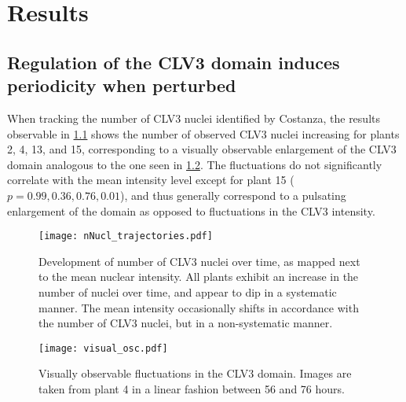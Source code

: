 
\chapter{Results}

\ifpdf
    \graphicspath{{Chapter3/Figs/Raster/}{Chapter3/Figs/PDF/}{Chapter3/Figs/}}
\else
    \graphicspath{{Chapter3/Figs/Vector/}{Chapter3/Figs/}}
\fi

\section{Regulation of the CLV3 domain induces periodicity when perturbed}
When tracking the number of CLV3 nuclei identified by Costanza, the results
observable in \cref{fig:clv3_trajs} shows the number of observed CLV3 nuclei
increasing for plants 2, 4, 13, and 15, corresponding to a visually observable
enlargement of the CLV3 domain analogous to the one seen in
\cref{fig:visual_osc}. The fluctuations do not significantly correlate with the
mean intensity level except for plant 15 ($p = 0.99, 0.36, 0.76, 0.01$), and
thus generally correspond to a pulsating enlargement of the domain as opposed to
fluctuations in the CLV3 intensity.  

\begin{figure}[H]
  \centering
  \texttt{[image: nNucl\_trajectories.pdf]}
  \caption[Number of CLV3 nuclei over time]{Development of number of CLV3 nuclei
    over time, as mapped next to the mean nuclear intensity. All plants exhibit
    an increase in the number of nuclei over time, and appear to dip in a
    systematic manner. The mean intensity occasionally shifts in accordance with
    the number of CLV3 nuclei, but in a non-systematic manner.}
  \label{fig:clv3_trajs}
\end{figure}

\begin{figure}[H]
  \centering
  \texttt{[image: visual\_osc.pdf]}
  \caption[Raw image CLV3 domain fluctuations]{Visually observable fluctuations
    in the CLV3 domain. Images are taken from plant 4 in a linear fashion
    between 56 and 76 hours.}
  \label{fig:visual_osc}
\end{figure}

